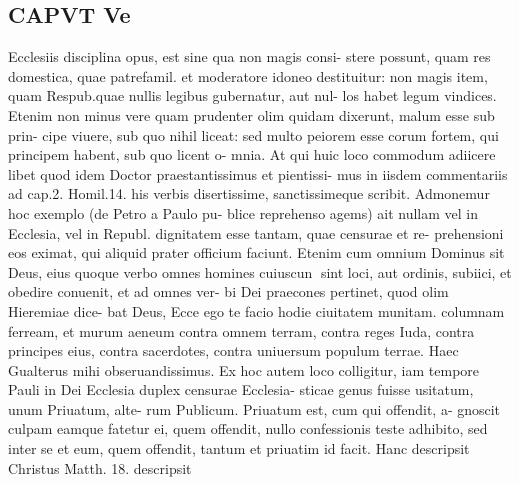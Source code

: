 \documentclass{article}
\begin{document}
\begin{pages}
\section*{CAPVT  Ve }
\marginpar{[ p.319 ]}Ecclesiis disciplina opus, est sine qua non magis consi- stere possunt, quam res domestica, quae patrefamil. et moderatore idoneo destituitur: non magis item, quam Respub.quae nullis legibus gubernatur, aut nul- los habet legum vindices. Etenim non minus vere quam prudenter olim quidam dixerunt, malum esse sub prin- cipe viuere, sub quo nihil liceat: sed multo peiorem esse corum fortem, qui principem habent, sub quo licent o- mnia. At qui huic loco commodum adiicere libet quod idem Doctor praestantissimus et pientissi- mus in iisdem commentariis ad cap.2. Homil.14. his verbis disertissime, sanctissimeque scribit. Admonemur hoc exemplo (de Petro a Paulo pu- blice reprehenso agems) ait nullam vel in Ecclesia, vel in Republ. dignitatem esse tantam, quae censurae et re- prehensioni eos eximat, qui aliquid prater officium faciunt. Etenim cum omnium Dominus sit Deus, eius quoque verbo omnes homines cuiuscun sint loci, aut ordinis, subiici, et obedire conuenit, et ad omnes ver- bi Dei praecones pertinet, quod olim Hieremiae dice- bat Deus, Ecce ego te facio hodie ciuitatem munitam. columnam ferream, et murum aeneum contra omnem terram, contra reges Iuda, contra principes eius, contra sacerdotes, contra uniuersum populum terrae. Haec Gualterus mihi obseruandissimus. Ex hoc autem loco colligitur, iam tempore Pauli in Dei Ecclesia duplex censurae Ecclesia- sticae genus fuisse usitatum, unum Priuatum, alte- rum Publicum. Priuatum est, cum qui offendit, a- gnoscit culpam eamque fatetur ei, quem offendit, nullo confessionis teste adhibito, sed inter se et eum, quem offendit, tantum et priuatim id facit. Hanc descripsit Christus Matth. 18. descripsit 

\end{pages}
\end{document}
